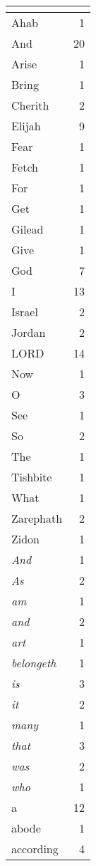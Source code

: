 \begin{center}
\begin{longtable}{l|r}
\hline \multicolumn{2}{c}{{ }} \\ \hline
\endfoot 
Ahab & 1\\ \hline 
And & 20\\ \hline 
Arise & 1\\ \hline 
Bring & 1\\ \hline 
Cherith & 2\\ \hline 
Elijah & 9\\ \hline 
Fear & 1\\ \hline 
Fetch & 1\\ \hline 
For & 1\\ \hline 
Get & 1\\ \hline 
Gilead & 1\\ \hline 
Give & 1\\ \hline 
God & 7\\ \hline 
I & 13\\ \hline 
Israel & 2\\ \hline 
Jordan & 2\\ \hline 
LORD & 14\\ \hline 
Now & 1\\ \hline 
O & 3\\ \hline 
See & 1\\ \hline 
So & 2\\ \hline 
The & 1\\ \hline 
Tishbite & 1\\ \hline 
What & 1\\ \hline 
Zarephath & 2\\ \hline 
Zidon & 1\\ \hline 
\emph{And} & 1\\ \hline 
\emph{As} & 2\\ \hline 
\emph{am} & 1\\ \hline 
\emph{and} & 2\\ \hline 
\emph{art} & 1\\ \hline 
\emph{belongeth} & 1\\ \hline 
\emph{is} & 3\\ \hline 
\emph{it} & 2\\ \hline 
\emph{many} & 1\\ \hline 
\emph{that} & 3\\ \hline 
\emph{was} & 2\\ \hline 
\emph{who} & 1\\ \hline 
a & 12\\ \hline 
abode & 1\\ \hline 
according & 4\\ \hline 

\end{longtable}
\end{center}

